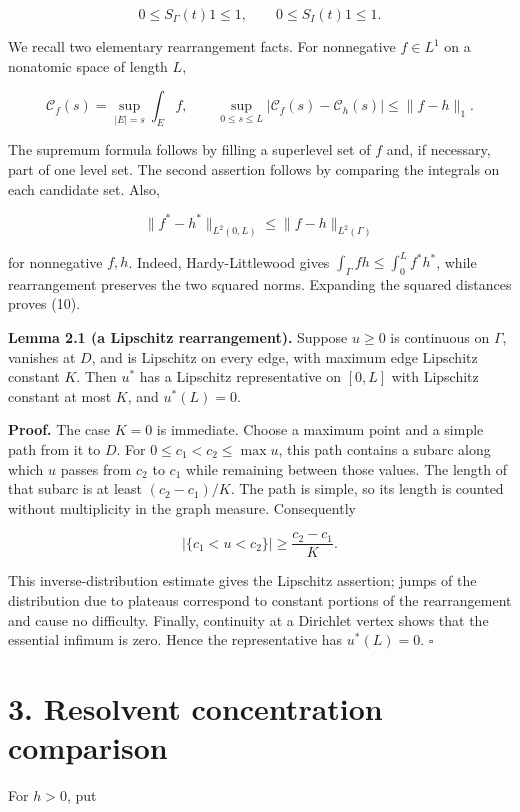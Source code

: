 \documentclass[11pt]{article}
\begin{document}
\[
0\le S_\Gamma(t)1\le1,
\qquad
0\le S_I(t)1\le1.
\tag{8}
\]

We recall two elementary rearrangement facts. For nonnegative
\(f\in L^1\) on a nonatomic space of length \(L\),

\[
\mathcal C_f(s)=\sup_{|E|=s}\int_E f,
\qquad
\sup_{0\le s\le L}|\mathcal C_f(s)-\mathcal C_h(s)|
\le\|f-h\|_1.
\tag{9}
\]

The supremum formula follows by filling a superlevel set of \(f\) and,
if necessary, part of one level set. The second assertion follows by
comparing the integrals on each candidate set. Also,

\[
\|f^*-h^*\|_{L^2(0,L)}\le\|f-h\|_{L^2(\Gamma)}
\tag{10}
\]

for nonnegative \(f,h\). Indeed, Hardy-Littlewood gives
\(\int_\Gamma fh\le\int_0^L f^*h^*\), while rearrangement preserves the
two squared norms. Expanding the squared distances proves (10).

\textbf{Lemma 2.1 (a Lipschitz rearrangement).} Suppose \(u\ge0\) is
continuous on \(\Gamma\), vanishes at \(D\), and is Lipschitz on every
edge, with maximum edge Lipschitz constant \(K\). Then \(u^*\) has a
Lipschitz representative on \([0,L]\) with Lipschitz constant at most
\(K\), and \(u^*(L)=0\).

\textbf{Proof.} The case \(K=0\) is immediate. Choose a maximum point
and a simple path from it to \(D\). For \(0\le c_1<c_2\le\max u\), this
path contains a subarc along which \(u\) passes from \(c_2\) to \(c_1\)
while remaining between those values. The length of that subarc is at
least \((c_2-c_1)/K\). The path is simple, so its length is counted
without multiplicity in the graph measure. Consequently

\[
|\{c_1<u<c_2\}|\ge\frac{c_2-c_1}{K}.
\tag{11}
\]

This inverse-distribution estimate gives the Lipschitz assertion; jumps
of the distribution due to plateaus correspond to constant portions of
the rearrangement and cause no difficulty. Finally, continuity at a
Dirichlet vertex shows that the essential infimum is zero. Hence the
representative has \(u^*(L)=0\). \(\square\)

\section{3. Resolvent concentration
comparison}\label{resolvent-concentration-comparison}

For \(h>0\), put
\end{document}
